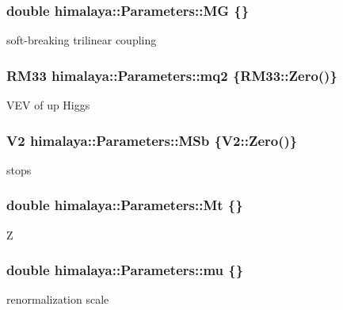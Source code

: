 \subsubsection[{\texorpdfstring{MG}{MG}}]{\setlength{\rightskip}{0pt plus 5cm}double himalaya\+::\+Parameters\+::\+MG \{\}}\hypertarget{structhimalaya_1_1Parameters_a3d42cda935b85168742dcd960d667501}{}\label{structhimalaya_1_1Parameters_a3d42cda935b85168742dcd960d667501}
soft-\/breaking trilinear coupling 
\subsubsection[{\texorpdfstring{mq2}{mq2}}]{\setlength{\rightskip}{0pt plus 5cm}R\+M33 himalaya\+::\+Parameters\+::mq2 \{R\+M33\+::\+Zero()\}}\hypertarget{structhimalaya_1_1Parameters_a0df106ebf113926e6fa1c47ca0c3123e}{}\label{structhimalaya_1_1Parameters_a0df106ebf113926e6fa1c47ca0c3123e}
V\+EV of up Higgs 
\subsubsection[{\texorpdfstring{M\+Sb}{MSb}}]{\setlength{\rightskip}{0pt plus 5cm}V2 himalaya\+::\+Parameters\+::\+M\+Sb \{V2\+::\+Zero()\}}\hypertarget{structhimalaya_1_1Parameters_acac147286ca9263f5fdba7a718c17506}{}\label{structhimalaya_1_1Parameters_acac147286ca9263f5fdba7a718c17506}
stops 
\subsubsection[{\texorpdfstring{Mt}{Mt}}]{\setlength{\rightskip}{0pt plus 5cm}double himalaya\+::\+Parameters\+::\+Mt \{\}}\hypertarget{structhimalaya_1_1Parameters_ad2b817fb45673b04ba2aac183b2719c3}{}\label{structhimalaya_1_1Parameters_ad2b817fb45673b04ba2aac183b2719c3}
Z 
\subsubsection[{\texorpdfstring{mu}{mu}}]{\setlength{\rightskip}{0pt plus 5cm}double himalaya\+::\+Parameters\+::mu \{\}}\hypertarget{structhimalaya_1_1Parameters_ac3b46727f8e81adce0d984fe118ad8ba}{}\label{structhimalaya_1_1Parameters_ac3b46727f8e81adce0d984fe118ad8ba}
renormalization scale 

